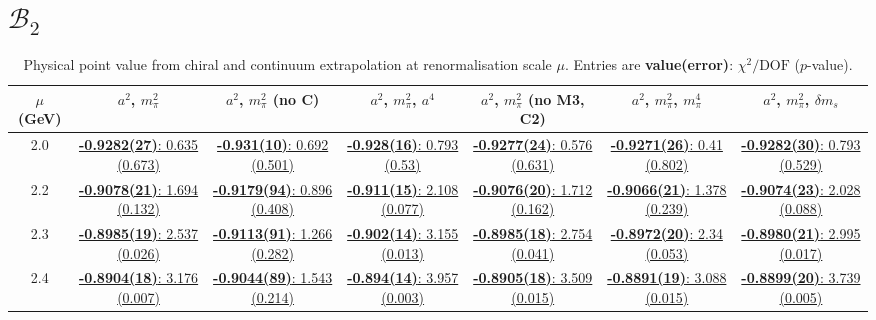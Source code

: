 \documentclass[12pt]{extarticle}
\begin{document}
\section{$\mathcal{B}_2$}
\begin{table}[h!]
\begin{center}
\begin{tabular}{|c|c|c|c|c|c|c|}
\hline
$\mu$ (GeV) & $a^2$, $m_\pi^2$& $a^2$, $m_\pi^2$ (no C)& $a^2$, $m_\pi^2$, $a^4$& $a^2$, $m_\pi^2$ (no M3, C2)& $a^2$, $m_\pi^2$, $m_\pi^4$& $a^2$, $m_\pi^2$, $\delta m_s$\\
\hline
2.0& \hyperlink{VVmAA/SUSY/bag_a2m2_20.pdf.1}{\textbf{-0.9282(27)}: 0.635 (0.673)} & \hyperlink{VVmAA/SUSY/bag_a2m2noC_20.pdf.1}{\textbf{-0.931(10)}: 0.692 (0.501)} & \hyperlink{VVmAA/SUSY/bag_a2a4m2_20.pdf.1}{\textbf{-0.928(16)}: 0.793 (0.53)} & \hyperlink{VVmAA/SUSY/bag_a2m2mcut_20.pdf.1}{\textbf{-0.9277(24)}: 0.576 (0.631)} & \hyperlink{VVmAA/SUSY/bag_a2m2m4_20.pdf.1}{\textbf{-0.9271(26)}: 0.41 (0.802)} & \hyperlink{VVmAA/SUSY/bag_a2m2delm_20.pdf.1}{\textbf{-0.9282(30)}: 0.793 (0.529)}\\
2.2& \hyperlink{VVmAA/SUSY/bag_a2m2_22.pdf.1}{\textbf{-0.9078(21)}: 1.694 (0.132)} & \hyperlink{VVmAA/SUSY/bag_a2m2noC_22.pdf.1}{\textbf{-0.9179(94)}: 0.896 (0.408)} & \hyperlink{VVmAA/SUSY/bag_a2a4m2_22.pdf.1}{\textbf{-0.911(15)}: 2.108 (0.077)} & \hyperlink{VVmAA/SUSY/bag_a2m2mcut_22.pdf.1}{\textbf{-0.9076(20)}: 1.712 (0.162)} & \hyperlink{VVmAA/SUSY/bag_a2m2m4_22.pdf.1}{\textbf{-0.9066(21)}: 1.378 (0.239)} & \hyperlink{VVmAA/SUSY/bag_a2m2delm_22.pdf.1}{\textbf{-0.9074(23)}: 2.028 (0.088)}\\
2.3& \hyperlink{VVmAA/SUSY/bag_a2m2_23.pdf.1}{\textbf{-0.8985(19)}: 2.537 (0.026)} & \hyperlink{VVmAA/SUSY/bag_a2m2noC_23.pdf.1}{\textbf{-0.9113(91)}: 1.266 (0.282)} & \hyperlink{VVmAA/SUSY/bag_a2a4m2_23.pdf.1}{\textbf{-0.902(14)}: 3.155 (0.013)} & \hyperlink{VVmAA/SUSY/bag_a2m2mcut_23.pdf.1}{\textbf{-0.8985(18)}: 2.754 (0.041)} & \hyperlink{VVmAA/SUSY/bag_a2m2m4_23.pdf.1}{\textbf{-0.8972(20)}: 2.34 (0.053)} & \hyperlink{VVmAA/SUSY/bag_a2m2delm_23.pdf.1}{\textbf{-0.8980(21)}: 2.995 (0.017)}\\
2.4& \hyperlink{VVmAA/SUSY/bag_a2m2_24.pdf.1}{\textbf{-0.8904(18)}: 3.176 (0.007)} & \hyperlink{VVmAA/SUSY/bag_a2m2noC_24.pdf.1}{\textbf{-0.9044(89)}: 1.543 (0.214)} & \hyperlink{VVmAA/SUSY/bag_a2a4m2_24.pdf.1}{\textbf{-0.894(14)}: 3.957 (0.003)} & \hyperlink{VVmAA/SUSY/bag_a2m2mcut_24.pdf.1}{\textbf{-0.8905(18)}: 3.509 (0.015)} & \hyperlink{VVmAA/SUSY/bag_a2m2m4_24.pdf.1}{\textbf{-0.8891(19)}: 3.088 (0.015)} & \hyperlink{VVmAA/SUSY/bag_a2m2delm_24.pdf.1}{\textbf{-0.8899(20)}: 3.739 (0.005)}\\
\hline
\end{tabular}
\caption{Physical point value from chiral and continuum extrapolation at renormalisation scale $\mu$. Entries are \textbf{value(error)}: $\chi^2/\text{DOF}$ ($p$-value).}
\end{center}
\end{table}
\end{document}
